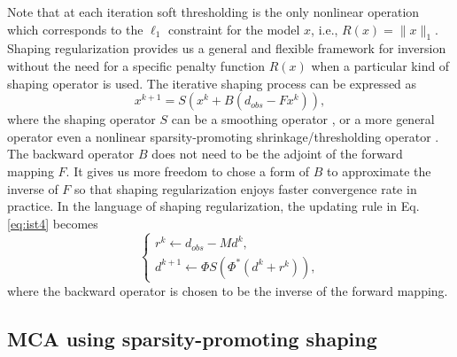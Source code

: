 Note that at each iteration soft thresholding is the only nonlinear operation which corresponds to the $\ell_1$ constraint for the model $x$, i.e., $R(x)=\|x\|_1$.
 Shaping regularization \citep{fomel2007shaping,fomel2008nonlinear} provides us a general and flexible framework for inversion without the need for a specific penalty function $R(x)$ when a particular kind of shaping operator is used. The iterative shaping process can be expressed as
 \begin{equation}\label{eq:shaping1}
   x^{k+1}=S(x^{k}+B(d_{obs}-Fx^{k})),
 \end{equation}
where the shaping operator $S$ can be a smoothing operator \citep{fomel2007shaping}, or a more general operator even  a nonlinear sparsity-promoting shrinkage/thresholding operator \citep{fomel2008nonlinear}. The backward operator $B$ does not need to be the adjoint of the forward mapping $F$. It gives us more freedom to chose a form of $B$ to approximate the inverse of $F$ so that shaping regularization enjoys faster convergence rate in practice. In the language of shaping regularization, the updating rule in Eq. \eqref{eq:ist4} becomes
\begin{equation}\label{eq:shaping2}
  \left\{
  \begin{array}{l}
    r^{k}\leftarrow d_{obs}-Md^{k}, \\
    d^{k+1}\leftarrow \Phi S(\Phi^{*}(d^{k}+r^{k})),
  \end{array}
  \right.
\end{equation}
where the backward operator is chosen to be the inverse of the forward mapping.

 
\subsection{MCA using sparsity-promoting shaping}

